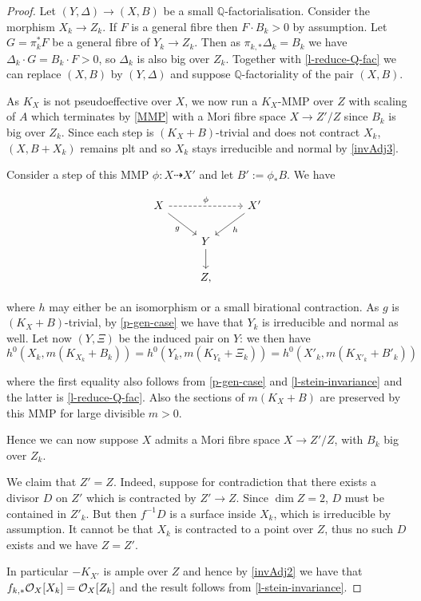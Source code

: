 	\begin{proof}
		Let $(Y, \Delta) \to (X, B)$ be a small $\mathbb{Q}$-factorialisation. 
		Consider the morphism $X_{k} \to Z_{k}$. If $F$ is a general fibre then $F \cdot B_{k} > 0$ by assumption. Let $G=\pi^{*}_{k}F$ be a general fibre of $Y_{k} \to Z_{k}$. Then as $\pi_{k,*}\Delta_{k}=B_{k}$ we have $\Delta_{k} \cdot G=B_{k}\cdot F > 0$, so $\Delta_{k}$ is also big over $Z_{k}$. Together with \autoref{l-reduce-Q-fac} we can replace $(X,B)$ by $(Y,\Delta)$ and suppose $\mathbb{Q}$-factoriality of the pair $(X,B)$.
		
		As $K_X$ is not pseudoeffective over $X$, we now run a $K_{X}$-MMP over $Z$ with scaling of $A$ which terminates by \autoref{MMP} with a Mori fibre space $X \to Z'/Z$ since $B_k$ is big over $Z_k$. 
		Since each step is $(K_{X}+B)$-trivial and does not contract $X_{k}$, $(X,B+X_{k})$ remains plt and so $X_{k}$ stays irreducible and normal by \autoref{invAdj3}.
		
		Consider a step of this MMP $\phi \colon X \dashrightarrow X'$ and let $B':=\phi_*B$.  We have
		
		\[\begin{tikzcd}
			X \arrow[swap, rd, "g"] \arrow[rr, "\phi", dashed] &                 & X' \arrow[ld, "h"] \\
			& Y \arrow[d] &                        \\
			& Z ,         &                       
		\end{tikzcd}\]

where $h$ may either be an isomorphism or a small birational contraction. As $g$ is $(K_X+B)$-trivial, by \autoref{p-gen-case} we have that $Y_k$ is irreducible and normal as well. Let now $(Y,\Xi)$ be the induced pair on $Y$: we then have
		$$h^{0}(X_{k},m(K_{X_k}+B_{k}))=h^{0}(Y_{k},m(K_{Y_{k}}+\Xi_k))=h^{0}(X'_{k},m(K_{X'_k}+B'_{k}))$$ 
		
		where the first equality also follows from \autoref{p-gen-case} and \autoref{l-stein-invariance} and the latter is \autoref{l-reduce-Q-fac}. Also the sections of $m(K_{X}+B)$ are preserved by this MMP for large divisible $m > 0$.
		
		Hence we can now suppose $X$ admits a Mori fibre space $X \to Z'/Z$, with $B_{k}$ big over $Z_{k}$.
		
		We claim that $Z'=Z$.
		Indeed, suppose for contradiction that there exists a divisor $D$ on $Z'$ which is contracted by $Z' \to Z$. Since $\dim Z=2$, $D$ must be contained in $Z'_k$. But then $f^{-1}D$ is a surface inside $X_{k}$, which is irreducible by assumption. It cannot be that $X_{k}$ is contracted to a point over $Z$, thus no such $D$ exists and we have $Z=Z'$.
		
		In particular $-K_{X'}$ is ample over $Z$ and hence by \autoref{invAdj2} we have that $f_{k,*} \mathcal{O}_{X}[X_{k}]=\mathcal{O}_{X}[Z_{k}]$ and the result follows from \autoref{l-stein-invariance}.
	\end{proof}
	
